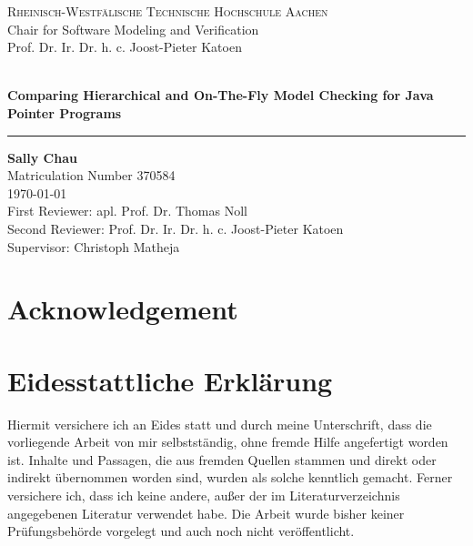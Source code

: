 \documentclass[a4paper, 12pt, twoside]{report}
\theoremstyle{plain}
\newcommand*\ruleline[1]{\par\noindent\raisebox{.8ex}{\makebox[\linewidth]{\hrulefill\hspace{1ex}\raisebox{-.8ex}{#1}\hspace{1ex}\hrulefill}}}
\begin{document}
	
	\begin{titlepage}
		\centering
		{\large \scshape Rheinisch-Westfälische Technische Hochschule Aachen}\\
		{\large
			Chair for Software Modeling and Verification\\
			Prof. Dr. Ir. Dr. h. c. Joost-Pieter Katoen\\}
		\vspace*{\fill}
		{\large \ruleline{Master Thesis}}\\
		\vspace{1cm}
		\textbf{\Huge Comparing Hierarchical and On-The-Fly Model Checking for Java Pointer Programs}\\
		\vspace{1cm}
		\hrule
		\vspace{1cm}
		{\Large \textbf{Sally Chau} \\}
		\vspace{0.25cm}
		{\large Matriculation Number 370584} \\
		{\large \today}\\
		\vspace{3cm}
		{\large First Reviewer: apl. Prof. Dr. Thomas Noll \\ Second Reviewer: Prof. Dr. Ir. Dr. h. c. Joost-Pieter Katoen \\ Supervisor: Christoph Matheja} \\ 
		\vspace{1cm}
		\vspace*{\fill}
	\end{titlepage}
	
	\pagestyle{empty}
	
	\clearpage\mbox{}\clearpage
	
	\chapter*{Acknowledgement} 
	
	
	\clearpage\mbox{}\clearpage
	
	\chapter*{Eidesstattliche Erklärung}
	
	Hiermit versichere ich an Eides statt und durch meine Unterschrift, dass die vorliegende Arbeit von mir selbstständig, ohne fremde Hilfe angefertigt worden ist. Inhalte und Passagen, die aus fremden Quellen stammen und direkt oder indirekt übernommen worden sind, wurden als solche kenntlich gemacht. Ferner versichere ich, dass ich keine andere, außer der im Literaturverzeichnis angegebenen Literatur verwendet habe. Die Arbeit wurde bisher keiner Prüfungsbehörde vorgelegt und auch noch nicht veröffentlicht.
	\vspace{20 mm}
	
\end{document}

